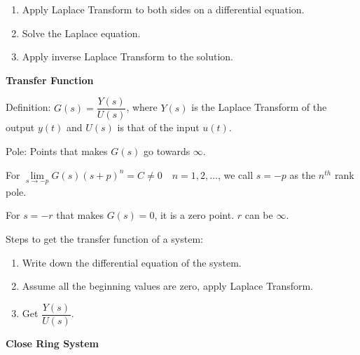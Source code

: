 \documentclass{article}
\newcommand{\bigtitle}[1]{
	\noindent
	\textbf{#1}
}
\begin{document}
\begin{spacing}{1.2}
\begin{enumerate}
\item Apply Laplace Transform to both sides on a differential equation.
\item Solve the Laplace equation.
\item Apply inverse Laplace Transform to the solution.
\end{enumerate}


\bigtitle{Transfer Function}

Definition: $G(s)=\dfrac{Y(s)}{U(s)}$, where $Y(s)$ is the Laplace Transform of the output $y(t)$ and $U(s)$ is that of the input $u(t)$.

Pole: Points that makes $G(s)$ go towards $\infty$.

For $\lim \limits_{s \rightarrow-p} G(s)(s+p)^{n}=C \neq 0 \quad n=1,2, \ldots$, we call $s=-p$ as the $n^{th}$ rank pole.

For $s=-r$ that makes $G(s) = 0$, it is a zero point. $r$ can be $\infty$.

Steps to get the transfer function of a system:

\begin{enumerate}
	\item Write down the differential equation of the system.
	\item Assume all the beginning values are zero, apply Laplace Transform.
	\item Get $\dfrac{Y(s)}{U(s)}$.
\end{enumerate}

\bigtitle{Close Ring System}

\begin{center}
\end{center}
\end{spacing}
\end{document}
